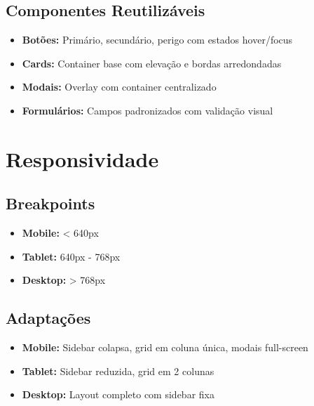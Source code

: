 \documentclass[12pt,a4paper]{article}
\begin{document}
\subsection{Componentes Reutilizáveis}

\begin{itemize}
    \item \textbf{Botões:} Primário, secundário, perigo com estados hover/focus
    \item \textbf{Cards:} Container base com elevação e bordas arredondadas
    \item \textbf{Modais:} Overlay com container centralizado
    \item \textbf{Formulários:} Campos padronizados com validação visual
\end{itemize}

\section{Responsividade}

\subsection{Breakpoints}
\begin{itemize}
    \item \textbf{Mobile:} < 640px
    \item \textbf{Tablet:} 640px - 768px
    \item \textbf{Desktop:} > 768px
\end{itemize}

\subsection{Adaptações}
\begin{itemize}
    \item \textbf{Mobile:} Sidebar colapsa, grid em coluna única, modais full-screen
    \item \textbf{Tablet:} Sidebar reduzida, grid em 2 colunas
    \item \textbf{Desktop:} Layout completo com sidebar fixa
\end{itemize}
\end{document}
